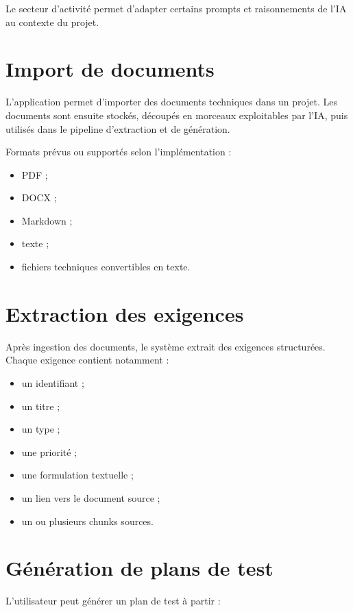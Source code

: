 \documentclass[
  french,
]{report}
\providecommand{\tightlist}{%
  \setlength{\itemsep}{0pt}\setlength{\parskip}{0pt}}
\begin{document}
Le secteur d'activité permet d'adapter certains prompts et raisonnements
de l'IA au contexte du projet.

\section{Import de documents}\label{import-de-documents}

L'application permet d'importer des documents techniques dans un projet.
Les documents sont ensuite stockés, découpés en morceaux exploitables
par l'IA, puis utilisés dans le pipeline d'extraction et de génération.

Formats prévus ou supportés selon l'implémentation :

\begin{itemize}
\tightlist
\item
  PDF ;
\item
  DOCX ;
\item
  Markdown ;
\item
  texte ;
\item
  fichiers techniques convertibles en texte.
\end{itemize}

\section{Extraction des exigences}\label{extraction-des-exigences}

Après ingestion des documents, le système extrait des exigences
structurées. Chaque exigence contient notamment :

\begin{itemize}
\tightlist
\item
  un identifiant ;
\item
  un titre ;
\item
  un type ;
\item
  une priorité ;
\item
  une formulation textuelle ;
\item
  un lien vers le document source ;
\item
  un ou plusieurs chunks sources.
\end{itemize}

\section{Génération de plans de
test}\label{guxe9nuxe9ration-de-plans-de-test}

L'utilisateur peut générer un plan de test à partir :
\end{document}
